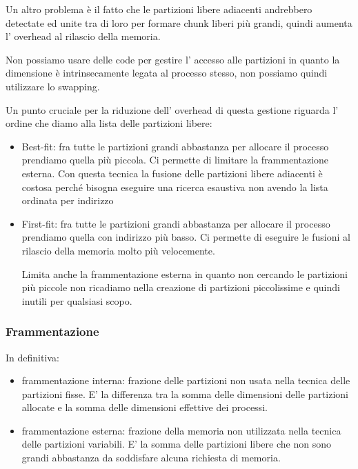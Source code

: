 Un altro problema è il fatto che le partizioni libere adiacenti andrebbero detectate ed unite tra di loro per formare chunk liberi più grandi, quindi aumenta l' overhead al rilascio della memoria.

Non possiamo usare delle code per gestire l' accesso alle partizioni in quanto la dimensione è intrinsecamente legata al processo stesso, non possiamo quindi utilizzare lo swapping.

Un punto cruciale per la riduzione dell' overhead di questa gestione riguarda l' ordine che diamo alla lista delle partizioni libere:
\begin{itemize}
    \item Best-fit: fra tutte le partizioni grandi abbastanza per allocare il processo prendiamo quella più piccola.
    Ci permette di limitare la frammentazione esterna.
    Con questa tecnica la fusione delle partizioni libere adiacenti è costosa perché bisogna eseguire una ricerca esaustiva non avendo la lista ordinata per indirizzo
    
    \item First-fit: fra tutte le partizioni grandi abbastanza per allocare il processo prendiamo quella con indirizzo più basso.
    Ci permette di eseguire le fusioni al rilascio della memoria molto più velocemente.
    
    Limita anche la frammentazione esterna in quanto non cercando le partizioni più piccole non ricadiamo nella creazione di partizioni piccolissime e quindi inutili per qualsiasi scopo.
\end{itemize}

\subsubsection{Frammentazione}
In definitiva:
\begin{itemize}
    \item frammentazione interna: frazione delle partizioni non usata nella tecnica delle partizioni fisse.
    E' la differenza tra la somma delle dimensioni delle partizioni allocate e la somma delle dimensioni effettive dei processi.

    \item frammentazione esterna: frazione della memoria non utilizzata nella tecnica delle partizioni variabili.
    E' la somma delle partizioni libere che non sono grandi abbastanza da soddisfare alcuna richiesta di memoria.
\end{itemize}

